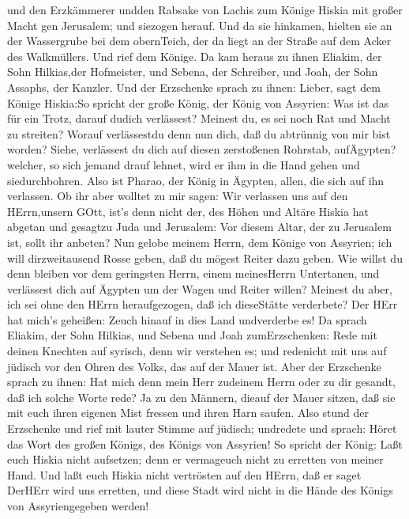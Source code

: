 und den Erzkämmerer undden Rabsake von Lachis zum Könige Hiskia mit
großer Macht gen Jerusalem; und siezogen herauf. Und da sie hinkamen,
hielten sie an der Wassergrube bei dem obernTeich, der da liegt an der
Straße auf dem Acker des Walkmüllers.  Und rief dem Könige.
Da kam heraus zu ihnen Eliakim, der Sohn Hilkias,der Hofmeister, und
Sebena, der Schreiber, und Joah, der Sohn Assaphs, der Kanzler.
 Und der Erzschenke sprach zu ihnen: Lieber, sagt dem
Könige Hiskia:So spricht der große König, der König von Assyrien: Was
ist das für ein Trotz, darauf dudich verlässest?  Meinest
du, es sei noch Rat und Macht zu streiten? Worauf verlässestdu denn nun
dich, daß du abtrünnig von mir bist worden?  Siehe,
verlässest du dich auf diesen zerstoßenen Rohrstab, aufÄgypten? welcher,
so sich jemand drauf lehnet, wird er ihm in die Hand gehen und
siedurchbohren. Also ist Pharao, der König in Ägypten, allen, die sich
auf ihn verlassen.  Ob ihr aber wolltet zu mir sagen: Wir
verlassen uns auf den HErrn,unsern GOtt, ist's denn nicht der, des Höhen
und Altäre Hiskia hat abgetan und gesagtzu Juda und Jerusalem: Vor
diesem Altar, der zu Jerusalem ist, sollt ihr anbeten?  Nun
gelobe meinem Herrn, dem Könige von Assyrien; ich will dirzweitausend
Rosse geben, daß du mögest Reiter dazu geben.  Wie willst
du denn bleiben vor dem geringsten Herrn, einem meinesHerrn Untertanen,
und verlässest dich auf Ägypten um der Wagen und Reiter willen?
 Meinest du aber, ich sei ohne den HErrn heraufgezogen, daß
ich dieseStätte verderbete? Der HErr hat mich's geheißen: Zeuch hinauf
in dies Land undverderbe es!  Da sprach Eliakim, der Sohn
Hilkias, und Sebena und Joah zumErzschenken: Rede mit deinen Knechten
auf syrisch, denn wir verstehen es; und redenicht mit uns auf jüdisch
vor den Ohren des Volks, das auf der Mauer ist.  Aber der
Erzschenke sprach zu ihnen: Hat mich denn mein Herr zudeinem Herrn oder
zu dir gesandt, daß ich solche Worte rede? Ja zu den Männern, dieauf der
Mauer sitzen, daß sie mit euch ihren eigenen Mist fressen und ihren Harn
saufen.  Also stund der Erzschenke und rief mit lauter
Stimme auf jüdisch; undredete und sprach: Höret das Wort des großen
Königs, des Königs von Assyrien!  So spricht der König:
Laßt euch Hiskia nicht aufsetzen; denn er vermageuch nicht zu erretten
von meiner Hand.  Und laßt euch Hiskia nicht vertrösten auf
den HErrn, daß er saget DerHErr wird uns erretten, und diese Stadt wird
nicht in die Hände des Königs von Assyriengegeben werden! 
